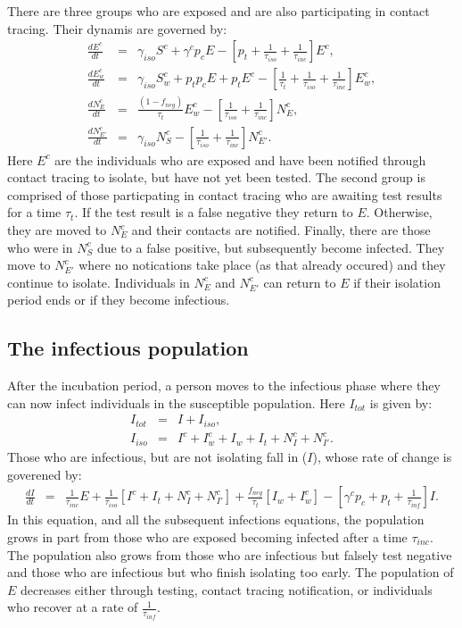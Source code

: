 \documentclass[notitlepage, superscriptaddress]{revtex4-2}
\begin{document}
There are three groups who are exposed and are also participating in contact tracing. Their dynamis are governed by:
\begin{eqnarray}
\label{E:dEc}
 \frac{dE^{c}}{dt} &=& \gamma_{iso} S^{c} + \gamma^{c} p_{c} E -[p_{t} +\frac{1}{\tau_{iso}} + \frac{1}{\tau_{inc}}] E^{c}, \\
 \frac{dE^{c}_{w}}{dt} &=& \gamma_{iso} S^{c}_{w} + p_{t}p_{c} E + p_{t}E^{c} - [\frac{1}{\tau_{t}}  + \frac{1}{\tau_{iso}}  + \frac{1}{\tau_{inc}}] E^{c}_{w}, \\ 
 \frac{dN^{c}_{E}}{dt} &=&  \frac{(1-f_{neg})}{\tau_{t}} E^{c}_{w} - [\frac{1}{\tau_{iso}}  + \frac{1}{\tau_{inc}}] N^{c}_{E}, \\ 
\frac{dN^{c}_{E'}}{dt} &=&  \gamma_{iso} N^{c}_{S} - [ \frac{1}{\tau_{iso}} + \frac{1}{\tau_{inc}}] N^{c}_{E'}. 
\end{eqnarray}
Here $E^{c}$ are the individuals who are exposed and have been notified through contact tracing to isolate, but have not yet been tested. The second group is comprised of those particpating in contact tracing who are awaiting test results for a time $\tau_{t}$. If the test result is a false negative they return to $E$. Otherwise, they are moved to $N^{c}_{E}$ and their contacts are notified. Finally, there are those who were in $N^{c}_{S}$ due to a false positive, but subsequently become infected. They move to $N^{c}_{E'}$ where no notications take place (as that already occured) and they continue to isolate. Individuals in $N^{c}_{E}$ and $N^{c}_{E'}$ can return to $E$ if their isolation period ends or if they become infectious.

\subsection{The infectious population}

After the incubation period, a person moves to the infectious phase where they can now infect individuals in the susceptible population. Here $I_{tot}$ is given by:
\begin{eqnarray}
\label{E:Itot}
I_{tot} &=& I + I_{iso}, \\ 
%
I_{iso} &=& I^{c} + I^{c}_{w} + I_{w} + I_{t} + N^{c}_{I} + N^{c}_{I'}.
\end{eqnarray}
 Those who are infectious, but are not isolating fall in ($I$), whose rate of change is goverened by:
\begin{eqnarray}
\label{E:dI}
\frac{dI}{dt} &=& \frac{1}{\tau_{inc}}E  + \frac{1}{\tau_{iso}}[I^{c} + I_{t} + N^{c}_{I} + N^{c}_{I'}] + \frac{f_{neg}}{\tau_{t}}[I_{w} + I^{c}_{w}] -  [\gamma^{c} p_{c} +p_{t} + \frac{1}{\tau_{inf}}] I.
\end{eqnarray}
In this equation, and all the subsequent infections equations, the population grows in part from those who are exposed becoming infected after a time $\tau_{inc}$. The population also grows from those who are infectious but falsely test negative and those who are infectious but who finish isolating too early. The population of $E$ decreases either through testing, contact tracing notification, or individuals who recover at a rate of $\frac{1}{\tau_{inf}}$. 
\end{document}
